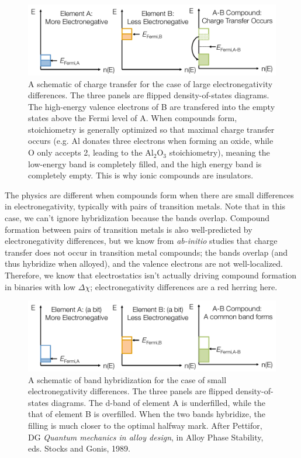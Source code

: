 \documentclass[12pt]{article}
\begin{document}
\begin{figure}[h]
\centering
\includegraphics[width=\textwidth]{chargeTransferLargeElectroneg2}
\caption{A schematic of charge transfer for the case of large electronegativity differences. The three panels are flipped density-of-states diagrams. The high-energy valence electrons of B are transfered into the empty states above the Fermi level of A. When compounds form, stoichiometry is generally optimized so that maximal charge transfer occurs (e.g. Al donates three electrons when forming an oxide, while O only accepts 2, leading to the Al$_2$O$_3$ stoichiometry), meaning the low-energy band is completely filled, and the high energy band is completely empty. This is why ionic compounds are insulators.}
\label{chargeTransfer}
\end{figure}

The physics are different when compounds form when there are small differences in electronegativity, typically with pairs of transition metals. Note that in this case, we can't ignore hybridization because the bands overlap. Compound formation between pairs of transition metals is also well-predicted by electronegativity differences, but we know from \emph{ab-initio} studies that charge transfer does not occur in transition metal compounds; the bands overlap (and thus hybridize when alloyed), and the valence electrons are not well-localized. Therefore, we know that electrostatics isn't actually driving compound formation in binaries with low $\Delta \chi$; electronegativity differences are a red herring here.

\begin{figure}[h]
\centering
\includegraphics[width=\textwidth]{bandFilingSchematic}
\caption{A schematic of band hybridization for the case of small electronegativity differences. The three panels are flipped density-of-states diagrams. The d-band of element A is underfilled, while the that of element B is overfilled. When the two bands hybridize, the filling is much closer to the optimal halfway mark. After Pettifor, DG \textit{Quantum mechanics in alloy design}, in Alloy Phase Stability, eds. Stocks and Gonis, 1989.}
\label{bandOverlap}
\end{figure}
\end{document}
